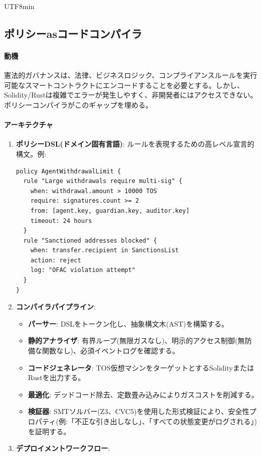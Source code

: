 \documentclass[11pt]{article}
\begin{document}
\begin{CJK}{UTF8}{min}
\subsection{ポリシーasコードコンパイラ}
\label{sec:policy-compiler}
\paragraph{動機} 憲法的ガバナンスは、法律、ビジネスロジック、コンプライアンスルールを実行可能なスマートコントラクトにエンコードすることを必要とする。しかし、Solidity/Rustは複雑でエラーが発生しやすく、非開発者にはアクセスできない。ポリシーコンパイラがこのギャップを埋める。

\paragraph{アーキテクチャ}
\begin{enumerate}[noitemsep]
  \item \textbf{ポリシーDSL(ドメイン固有言語)}: ルールを表現するための高レベル宣言的構文。例:
  \begin{verbatim}
policy AgentWithdrawalLimit {
  rule "Large withdrawals require multi-sig" {
    when: withdrawal.amount > 10000 TOS
    require: signatures.count >= 2
    from: [agent.key, guardian.key, auditor.key]
    timeout: 24 hours
  }
  rule "Sanctioned addresses blocked" {
    when: transfer.recipient in SanctionsList
    action: reject
    log: "OFAC violation attempt"
  }
}
  \end{verbatim}
  \item \textbf{コンパイラパイプライン}:
    \begin{itemize}[noitemsep]
      \item \textbf{パーサー}: DSLをトークン化し、抽象構文木(AST)を構築する。
      \item \textbf{静的アナライザ}: 有界ループ(無限ガスなし)、明示的アクセス制御(無防備な関数なし)、必須イベントログを確認する。
      \item \textbf{コードジェネレータ}: TOS仮想マシンをターゲットとするSolidityまたはRustを出力する。
      \item \textbf{最適化}: デッドコード除去、定数畳み込みによりガスコストを削減する。
      \item \textbf{検証器}: SMTソルバー(Z3、CVC5)を使用した形式検証により、安全性プロパティ(例:「不正な引き出しなし」、「すべての状態変更がログされる」)を証明する。
    \end{itemize}
  \item \textbf{デプロイメントワークフロー}:

\end{enumerate}
\end{CJK}
\end{document}
